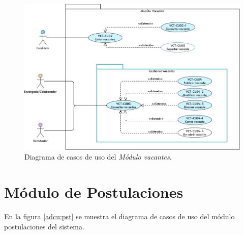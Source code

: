 	\begin{figure}[hbtp!]
		\begin{center}
			\includegraphics[width=1 \textwidth]{anexos/imagenes/CUVCT.png}
		\end{center}
		
		\caption{Diagrama de casos de uso del \textit{Módulo vacantes}.}
		\label{adcu:vct}
	\end{figure}

	
	

	
	

	
	

	
	

	
	
	

	\clearpage
	\section{Módulo de Postulaciones}
	En la figura \ref{adcu:pst} se muestra el diagrama de casos de uso del módulo postulaciones del sistema.

